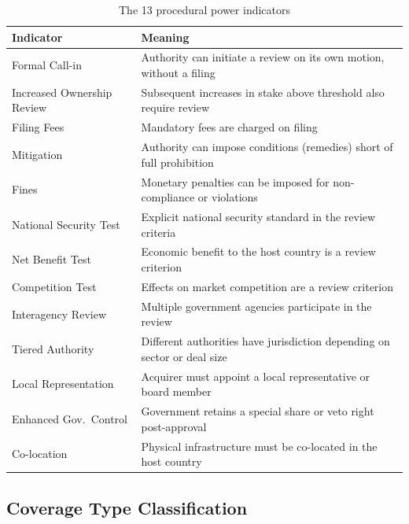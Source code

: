 \documentclass[12pt,a4paper]{article}
\begin{document}
\begin{table}[h]
\centering
\begin{tabularx}{\linewidth}{lX}
\toprule
\textbf{Indicator} & \textbf{Meaning} \\
\midrule
Formal Call-in & Authority can initiate a review on its own motion, without a filing \\
Increased Ownership Review & Subsequent increases in stake above threshold also require review \\
Filing Fees & Mandatory fees are charged on filing \\
Mitigation & Authority can impose conditions (remedies) short of full prohibition \\
Fines & Monetary penalties can be imposed for non-compliance or violations \\
National Security Test & Explicit national security standard in the review criteria \\
Net Benefit Test & Economic benefit to the host country is a review criterion \\
Competition Test & Effects on market competition are a review criterion \\
Interagency Review & Multiple government agencies participate in the review \\
Tiered Authority & Different authorities have jurisdiction depending on sector or deal size \\
Local Representation & Acquirer must appoint a local representative or board member \\
Enhanced Gov.\ Control & Government retains a special share or veto right post-approval \\
Co-location & Physical infrastructure must be co-located in the host country \\
\bottomrule
\end{tabularx}
\caption{The 13 procedural power indicators}
\end{table}

\subsection{Coverage Type Classification}
\end{document}
